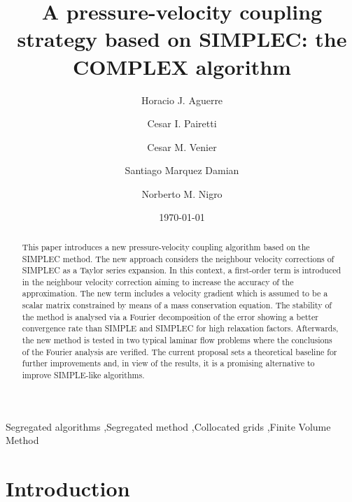 \documentclass[final,3p,times,11pt,onecolumn]{myElsarticle}
\date{\today}
\numberwithin{equation}{section}
\begin{document}
\begin{frontmatter}

\title{A pressure-velocity coupling strategy based on SIMPLEC: the COMPLEX algorithm}
 
\author[a]{Horacio J. Aguerre}
\author[b,a]{Cesar I. Pairetti}
\author[a,b]{Cesar M. Venier}
\author[a,c]{Santiago Marquez Damian}
\author[a,d]{Norberto M. Nigro}

\address[a]{Centro de Investigación de Métodos Computacionales, CONICET-UNL, Santa Fe, Argentina}
\address[b]{Escuela de Ingenier\'ia Mec\'anica, Facultad de Ciencias Exactas, Ingenieria y Agrimensura, Universidad Nacional de Rosario, Rosario, Argentina}
\address[c]{Facultad Regional Santa Fe, Universidad Tecnologica Nacional, Santa Fe, Argentina}
\address[d]{Facultad de Ingeniería y Ciencias Hídricas, Universidad Nacional del Litoral, Santa Fe, Argentina}

\begin{abstract}
This paper introduces a new pressure-velocity coupling algorithm based on the SIMPLEC method. The new approach considers the neighbour velocity corrections of SIMPLEC as a Taylor series expansion. In this context, a first-order term is introduced in the neighbour velocity correction aiming to increase the accuracy of the approximation. The new term includes a velocity gradient which is assumed to be a scalar matrix constrained by means of a mass conservation equation.
The stability of the method is analysed via a Fourier decomposition of the error showing a better convergence rate than SIMPLE and SIMPLEC for high relaxation factors. Afterwards, the new method is tested in two typical laminar flow problems where the conclusions of the Fourier analysis are verified. The current proposal sets a theoretical baseline for further improvements and, in view of the results, it is a promising alternative to improve SIMPLE-like algorithms.
\end{abstract}

\begin{keyword}
Segregated algorithms \sep Segregated method \sep Collocated grids \sep Finite Volume Method 
\end{keyword}
\end{frontmatter}

\section{Introduction}
\end{document}
